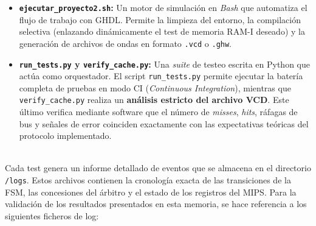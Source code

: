 \documentclass[12pt,a4paper]{article}
\begin{document}
\begin{itemize}
    \item \textbf{\texttt{ejecutar\_proyecto2.sh}:} Un motor de simulación en \textit{Bash} que automatiza el flujo de trabajo con GHDL. Permite la limpieza del entorno, la compilación selectiva (enlazando dinámicamente el test de memoria RAM-I deseado) y la generación de archivos de ondas en formato \texttt{.vcd} o \texttt{.ghw}.
    \item \textbf{\texttt{run\_tests.py} y \texttt{verify\_cache.py}:} Una \textit{suite} de testeo escrita en Python que actúa como orquestador. El script \texttt{run\_tests.py} permite ejecutar la batería completa de pruebas en modo CI (\textit{Continuous Integration}), mientras que \texttt{verify\_cache.py} realiza un \textbf{análisis estricto del archivo VCD}. Este último verifica mediante software que el número de \textit{misses}, \textit{hits}, ráfagas de bus y señales de error coinciden exactamente con las expectativas teóricas del protocolo implementado.
\end{itemize}

\\
Cada test genera un informe detallado de eventos que se almacena en el directorio \texttt{/logs}. Estos archivos contienen la cronología exacta de las transiciones de la FSM, las concesiones del árbitro y el estado de los registros del MIPS. Para la validación de los resultados presentados en esta memoria, se hace referencia a los siguientes ficheros de log:
\end{document}
